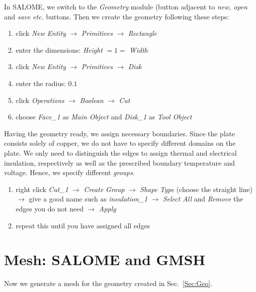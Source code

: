 \documentclass{article}
\begin{document}
In SALOME, we switch to the \textit{Geometry} module (button adjacent to \textit{new, open} and \textit{save etc.} buttons.
Then we create the geometry following these steps:
\begin{enumerate}
\item click \textit{New Entity} $\rightarrow$ \textit{Primitives} $\rightarrow$ \textit{Rectangle}
\item enter the dimensions: \textit{Height} $=1=$ \textit{Width}
\item click \textit{New Entity} $\rightarrow$ \textit{Primitives} $\rightarrow$ \textit{Disk}
\item enter the radius: $0.1$
\item click \textit{Operations} $\rightarrow$ \textit{Boolean} $\rightarrow$ \textit{Cut}
\item choose \textit{Face\_1} as \textit{Main Object} and \textit{Disk\_1} as \textit{Tool Object}
\end{enumerate}
Having the geometry ready, we assign necessary boundaries. 
Since the plate consists solely of copper, we do not have to specify different domains on the plate.
We only need to distinguish the edges to assign thermal and electrical insulation, respectively as well as the prescribed boundary temperature and voltage.
Hence, we specify different \textit{groups}.
\begin{enumerate}
\item right click \textit{Cut\_1} $\rightarrow$ \textit{Create Group} $\rightarrow$ \textit{Shape Type} (choose the straight line) $\rightarrow$ give a good name such as \textit{insulation\_1} $\rightarrow$ \textit{Select All} and \textit{Remove} the edges you do not need $\rightarrow$ \textit{Apply}
\item repeat this until you have assigned all edges
\end{enumerate}
\section{Mesh: SALOME and GMSH}
\label{Sec:Mesh}
Now we generate a mesh for the geometry created in Sec.~\ref{Sec:Geo}.
\end{document}
